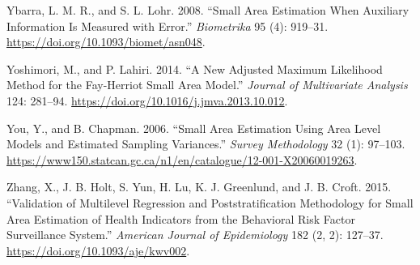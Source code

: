\begin{CSLReferences}{1}{0}
\leavevmode{}%
Ybarra, L. M. R., and S. L. Lohr. 2008. {``Small Area Estimation When Auxiliary Information Is Measured with Error.''} \emph{Biometrika} 95 (4): 919--31. \url{https://doi.org/10.1093/biomet/asn048}.

\leavevmode{}%
Yoshimori, M., and P. Lahiri. 2014. {``A New Adjusted Maximum Likelihood Method for the {Fay-Herriot} Small Area Model.''} \emph{Journal of Multivariate Analysis} 124: 281--94. \url{https://doi.org/10.1016/j.jmva.2013.10.012}.

\leavevmode{}%
You, Y., and B. Chapman. 2006. {``Small Area Estimation Using Area Level Models and Estimated Sampling Variances.''} \emph{Survey Methodology} 32 (1): 97--103. \url{https://www150.statcan.gc.ca/n1/en/catalogue/12-001-X20060019263}.

\leavevmode{}%
Zhang, X., J. B. Holt, S. Yun, H. Lu, K. J. Greenlund, and J. B. Croft. 2015. {``Validation of Multilevel Regression and Poststratification Methodology for Small Area Estimation of Health Indicators from the Behavioral Risk Factor Surveillance System.''} \emph{American Journal of Epidemiology} 182 (2, 2): 127--37. \url{https://doi.org/10.1093/aje/kwv002}.

\end{CSLReferences}



\address{%
Sylvia Harmening\\
Institute for Statistics and Econometrics, School of Business \&
Economics, Freie Universität Berlin\\%
Garystr.~21, 14195 Berlin\\ Germany\\
%
%
%
\href{mailto:sylvia.harmening@fu-berlin.de}{\nolinkurl{sylvia.harmening@fu-berlin.de}}%
}

\address{%
Ann-Kristin Kreutzmann\\
Institute for Statistics and Econometrics, School of Business \&
Economics, Freie Universität Berlin\\%
Garystr.~21, 14195 Berlin\\ Germany\\
%
%
%
\href{mailto:ann-kristin.kreutzmann@fu-berlin.de}{\nolinkurl{ann-kristin.kreutzmann@fu-berlin.de}}%
}

\address{%
Sören Schmidt\\
Institute for Statistics and Econometrics, School of Business \&
Economics, Freie Universität Berlin\\%
Garystr.~21, 14195 Berlin\\ Germany\\
%
%
%
\href{mailto:soeren.pannier@fu-berlin.de}{\nolinkurl{soeren.pannier@fu-berlin.de}}%
}

